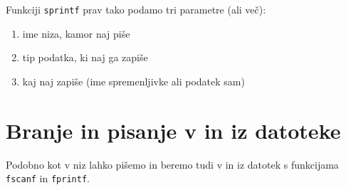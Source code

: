 \documentclass{article}
\begin{document}
\noindent Funkciji \verb+sprintf+ prav tako podamo tri parametre (ali več):
\begin{enumerate}
	\item ime niza, kamor naj piše
	\item tip podatka, ki naj ga zapiše
	\item kaj naj zapiše (ime spremenljivke ali podatek sam)
\end{enumerate}

\pagebreak
\section{Branje in pisanje v in iz datoteke}

Podobno kot v niz lahko pišemo in beremo tudi v in iz datotek s funkcijama \verb+fscanf+ in \verb+fprintf+.
\end{document}
